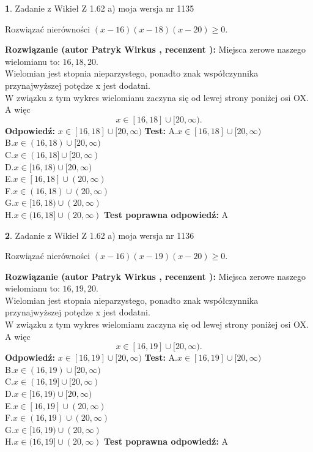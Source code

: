 \documentclass[12pt, a4paper]{article}
\theoremstyle{definition} %
\newtheorem{zad}{}
\newcommand{\zadStart}[1]{\begin{zad}#1\newline}
\newcommand{\zadStop}{\end{zad}}
\newcommand{\rozwStart}[2]{\noindent \textbf{Rozwiązanie (autor #1 , recenzent #2): }\newline}
\newcommand{\rozwStop}{\newline}
\newcommand{\odpStart}{\noindent \textbf{Odpowiedź:}\newline}
\newcommand{\odpStop}{\newline}
\newcommand{\testStart}{\noindent \textbf{Test:}\newline}
\newcommand{\testStop}{\newline}
\newcommand{\kluczStart}{\noindent \textbf{Test poprawna odpowiedź:}\newline}
\newcommand{\kluczStop}{\newline}
\begin{document}
\zadStart{Zadanie z Wikieł Z 1.62 a) moja wersja nr 1135}

Rozwiązać nierówności $(x-16)(x-18)(x-20)\ge0$.
\zadStop
\rozwStart{Patryk Wirkus}{}
Miejsca zerowe naszego wielomianu to: $16, 18, 20$.\\
Wielomian jest stopnia nieparzystego, ponadto znak współczynnika przy\linebreak najwyższej potędze x jest dodatni.\\ W związku z tym wykres wielomianu zaczyna się od lewej strony poniżej osi OX. A więc $$x \in [16,18] \cup [20,\infty).$$
\rozwStop
\odpStart
$x \in [16,18] \cup [20,\infty)$
\odpStop
\testStart
A.$x \in [16,18] \cup [20,\infty)$\\
B.$x \in (16,18) \cup [20,\infty)$\\
C.$x \in (16,18] \cup [20,\infty)$\\
D.$x \in [16,18) \cup [20,\infty)$\\
E.$x \in [16,18] \cup (20,\infty)$\\
F.$x \in (16,18) \cup (20,\infty)$\\
G.$x \in [16,18) \cup (20,\infty)$\\
H.$x \in (16,18] \cup (20,\infty)$
\testStop
\kluczStart
A
\kluczStop



\zadStart{Zadanie z Wikieł Z 1.62 a) moja wersja nr 1136}

Rozwiązać nierówności $(x-16)(x-19)(x-20)\ge0$.
\zadStop
\rozwStart{Patryk Wirkus}{}
Miejsca zerowe naszego wielomianu to: $16, 19, 20$.\\
Wielomian jest stopnia nieparzystego, ponadto znak współczynnika przy\linebreak najwyższej potędze x jest dodatni.\\ W związku z tym wykres wielomianu zaczyna się od lewej strony poniżej osi OX. A więc $$x \in [16,19] \cup [20,\infty).$$
\rozwStop
\odpStart
$x \in [16,19] \cup [20,\infty)$
\odpStop
\testStart
A.$x \in [16,19] \cup [20,\infty)$\\
B.$x \in (16,19) \cup [20,\infty)$\\
C.$x \in (16,19] \cup [20,\infty)$\\
D.$x \in [16,19) \cup [20,\infty)$\\
E.$x \in [16,19] \cup (20,\infty)$\\
F.$x \in (16,19) \cup (20,\infty)$\\
G.$x \in [16,19) \cup (20,\infty)$\\
H.$x \in (16,19] \cup (20,\infty)$
\testStop
\kluczStart
A
\kluczStop
\end{document}
